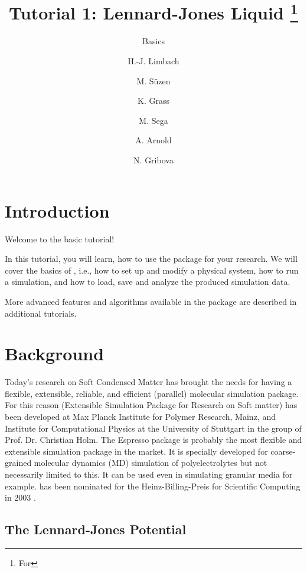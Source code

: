 \documentclass[
paper=a4,                       %
fontsize=11pt,                  %
twoside,                        %
footsepline,                    %
headsepline,                    %
headinclude=false,              %
footinclude=false,              %
pagesize,                       %
]{scrartcl}
\begin{document}
\esptitlehead

\title{Tutorial 1: Lennard-Jones Liquid%
\ifdefined\esversion%
\thanks{For \es \esversion}%
\fi%
}
\subtitle{\es Basics}
\author{H.-J. Limbach \and M. S\"uzen \and K. Grass \and M. Sega \and
  A. Arnold \and N. Gribova}
\maketitle
\tableofcontents

\section{Introduction}

Welcome to the basic \es{} tutorial!

In this tutorial, you will learn, how to use the \es{} package for your 
research. We will cover the basics of \es, i.e., how to set up and modify a 
physical system, how to run a simulation, and how to load, save and analyze
the produced simulation data.

More advanced features and algorithms available in the \es{} package are 
described in additional tutorials.

\section{Background}

Today's research on Soft Condensed Matter has brought the needs for having a 
flexible, extensible, reliable, and efficient (parallel) molecular simulation 
package. For this reason \es{} (Extensible Simulation Package for Research on 
Soft matter) \cite{esp_url} has been developed at Max Planck Institute for 
Polymer Research, Mainz, and Institute for Computational Physics at the University of Stuttgart in  the group of Prof. Dr. Christian Holm\cite{limbach2006ees,arnold13a}. The Espresso package is probably the most flexible and 
extensible simulation package in the market. It is specially developed for 
coarse-grained molecular dynamics (MD) simulation of polyelectrolytes but not 
necessarily limited to this. It can be used even in simulating granular media 
for example. \es{} has been nominated for the Heinz-Billing-Preis for 
Scientific Computing in 2003 \cite{arnold2003ees}.

\subsection{The Lennard-Jones Potential}
\end{document}
